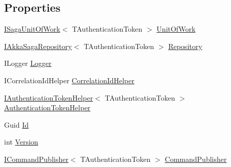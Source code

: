 \subsection*{Properties}
\begin{DoxyCompactItemize}
\item 
\hyperlink{interfaceCqrs_1_1Domain_1_1ISagaUnitOfWork}{I\+Saga\+Unit\+Of\+Work}$<$ T\+Authentication\+Token $>$ \hyperlink{classCqrs_1_1Akka_1_1Domain_1_1AkkaSaga_addbf93da18d577da8f8f1e2dba5cafb9}{Unit\+Of\+Work}
\item 
\hyperlink{interfaceCqrs_1_1Akka_1_1Domain_1_1IAkkaSagaRepository}{I\+Akka\+Saga\+Repository}$<$ T\+Authentication\+Token $>$ \hyperlink{classCqrs_1_1Akka_1_1Domain_1_1AkkaSaga_a4c0662a1aa78c8de5fa32c71a54cf393}{Repository}
\item 
I\+Logger \hyperlink{classCqrs_1_1Akka_1_1Domain_1_1AkkaSaga_acbb9a6e1cde3e2846270a8fe3f55bc92}{Logger}
\item 
I\+Correlation\+Id\+Helper \hyperlink{classCqrs_1_1Akka_1_1Domain_1_1AkkaSaga_a11d543b42aa6e55644c2b349336e962a}{Correlation\+Id\+Helper}
\item 
\hyperlink{interfaceCqrs_1_1Authentication_1_1IAuthenticationTokenHelper}{I\+Authentication\+Token\+Helper}$<$ T\+Authentication\+Token $>$ \hyperlink{classCqrs_1_1Akka_1_1Domain_1_1AkkaSaga_a18e4d7faa9cd9d10ac2ac0bd3b6c9fc9}{Authentication\+Token\+Helper}
\item 
Guid \hyperlink{classCqrs_1_1Akka_1_1Domain_1_1AkkaSaga_a98fa8a5ebc587bc02b1c98d5ffbc997e}{Id}
\item 
int \hyperlink{classCqrs_1_1Akka_1_1Domain_1_1AkkaSaga_a3fda31a3857e12a1aed60f4a4f04edd1}{Version}
\item 
\hyperlink{interfaceCqrs_1_1Commands_1_1ICommandPublisher}{I\+Command\+Publisher}$<$ T\+Authentication\+Token $>$ \hyperlink{classCqrs_1_1Akka_1_1Domain_1_1AkkaSaga_ac00968d1d69d89d46b43af10fc0d4510}{Command\+Publisher}
\end{DoxyCompactItemize}


